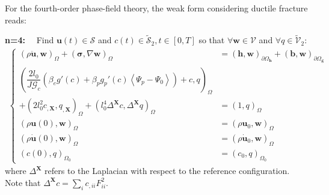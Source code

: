 For the fourth-order phase-field theory, the weak form considering ductile fracture reads:

\textbf{n=4:}$\quad$ Find $\mathbf{u}\left(t\right)\in\bm{\mathcal{S}}$ and $c\left(t\right)\in\tilde{\mathcal{S}}_{2},t\in\left[0,T\right]$ so that $\forall \mathbf{w}\in\bm{\mathcal{V}}$ and $\forall q\in\tilde{\mathcal{V}}_{2}$:
\begin{equation} \label{eq:weak_4_ductile}
\begin{aligned}
\left\{\begin{alignedat}{1}
	\left(\rho \ddot{\mathbf{u}},\mathbf{w}\right)_{\Omega} + \left(\bm{\sigma},\nabla\mathbf{w}\right)_{\Omega} &= \left(\mathbf{h},\mathbf{w}\right)_{\partial\Omega_{\mathbf{h}}} + \left(\mathbf{b},\mathbf{w}\right)_{\partial\Omega_{\mathbf{g}}} \\
	\left(\dfrac{2l_{0}}{J\mathcal{G}_{c}}\left(\beta_{e}g'\left(c\right)+\beta_{p}g_{p}'\left(c\right)\left<\Psi_{p}-\Psi_{0}\right>\right)+c,q\right)_{\Omega} & \\
	+\left(2l_{0}^{2} c_{,\mathbf{X}}, q_{,\mathbf{X}}\right)_{\Omega} + \left(l_{0}^{4}\Delta^{\mathbf{X}} c,\Delta^{\mathbf{X}} q\right)_{\Omega} &= \left(1,q\right)_{\Omega} \\
	\left(\rho\mathbf{u}\left(0\right),\mathbf{w}\right)_{\Omega} &= \left(\rho\mathbf{u}_{0},\mathbf{w}\right)_{\Omega} \\
	\left(\rho\dot{\mathbf{u}}\left(0\right),\mathbf{w}\right)_{\Omega} &= \left(\rho\dot{\mathbf{u}}_{0},\mathbf{w}\right)_{\Omega} \\
	\left(c\left(0\right),q\right)_{\Omega_{0}} &= \left(c_{0},q\right)_{\Omega_{0}}
\end{alignedat}\right.
\end{aligned}
\end{equation} 
where $\Delta^{\mathbf{X}}$ refers to the Laplacian with respect to the reference configuration. Note that $\Delta^{\mathbf{X}}c=\sum\limits_{i}c_{,ii}F_{ii}^{2}$.

